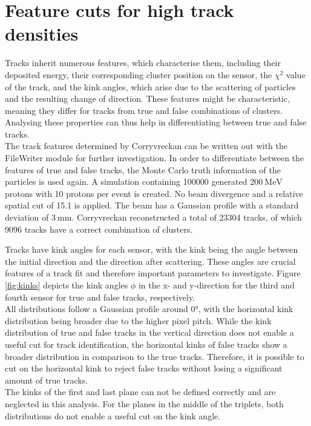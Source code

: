 
\section{Feature cuts for high track densities}\label{sec:feature}
Tracks inherit numerous features, which characterise them,
including their deposited energy, their corresponding cluster position on the sensor, the $\chi^2$ value of the track, and the kink angles, which
arise due to the scattering of particles and the resulting change of direction.
These features might be characteristic, meaning they differ for tracks from true and false combinations of clusters.
Analysing these properties can thus help in differentiating between true and false tracks. \\
The track features determined by Corryvreckan can be written out with the FileWriter module for further investigation.
In order to differentiate between the features of true and false tracks, the Monte Carlo truth information of the particles is used again.
A simulation containing 100000 generated $\SI{200}{\mega\eV}$ protons with 10 protons per event is created.
No beam divergence and a relative spatial cut of 15.1 is applied.
The beam has a Gaussian profile with a standard deviation of $\SI{3}{\milli\meter}$.
Corryvreckan reconstructed a total of 23304 tracks, of which 9096 tracks have a correct combination of clusters.

Tracks have kink angles for each sensor, with the kink being
the angle between the initial direction and the direction after scattering. These angles are crucial features of a track fit and therefore important parameters to investigate.
Figure \ref{fig:kinks} depicts the kink angles $\phi$ in the x- and y-direction for the third and fourth sensor for true and false tracks, respectively. \\
All distributions follow a Gaussian profile around 0°, with the horizontal kink distribution being broader due to the higher pixel pitch.
While the kink distribution of true and false tracks in the vertical direction does not enable a useful
cut for track identification, the horizontal kinks of false tracks show a broader distribution in comparison to the true tracks. Therefore, it is
possible to cut on the horizontal kink to reject false tracks without losing a significant amount of true tracks. \\
The kinks of the first and last plane can not be defined correctly and are neglected in this analysis. For the planes in the middle of the triplets, both
distributions do not enable a useful cut on the kink angle.

